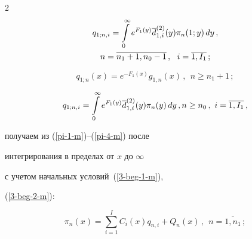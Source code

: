 \begin{multicols}{2}
\begin{multline*}
q_{1;n,i}= \int\limits_0^\infty e^{F_{1}(y)} \d^{(2)}_{1,i}(y) \pi_n(1;y)\, dy\,,\\ 


n=\overline{n_1+1,n_0-1}\,,


\ \ i=\overline{1,I_1}\,    ;


\end{multline*}


$$


q_{1;n}(x)= e^{-F_{1}(x)} g_{1,n}(x)\,,


\ \ n\ge n_1+1\,;


$$







\vspace*{-12pt}





\noindent


\begin{equation*}


q_{1;n,i} = \int\limits_0^\infty e^{F_{1}(y)}  \d^{(2)}_{1,i}(y) \pi_n(y)\, dy\,,\\ 


n\ge n_0\,,\  i=\overline{1,I_1}\,,


\end{equation*}




получаем из (\ref{pi-1-m})--(\ref{pi-4-m}) после


интегрирования в пределах от $x$ до $\infty$


с учетом начальных условий~(\ref{3-beg-1-m}),


(\ref{3-beg-2-m}):




\begin{equation}


\label{ipi-1-m}


\pi_n(x)= \sum\limits_{i=1}^{I} C_i(x) q_{n,i}+Q_{n}(x) \,,


\ \ n=\overline{1,n_1}\,;


\end{equation}







\vspace*{-24pt}






\end{multicols}
